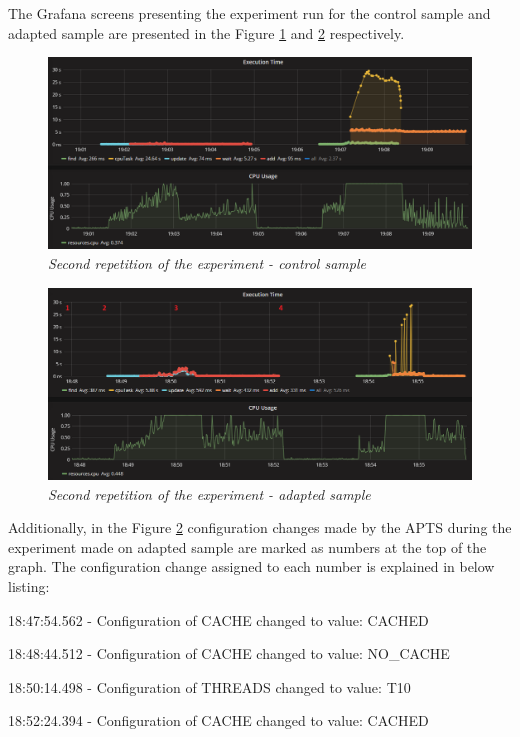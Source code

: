 \documentclass[12pt,a4paper]{article}
\let\tmpone\enumerate
\let\tmptwo\endenumerate
\renewenvironment{enumerate}{\tmpone\addtolength{\itemsep}{-0.4\baselineskip}}{\tmptwo}
\begin{document}
The Grafana screens presenting the experiment run for the control sample and adapted sample are presented in the Figure \ref{figure:random:screen:control:2} and \ref{figure:random:screen:adapted:2} respectively. 


\begin{figure}[!htb]
\centering
\includegraphics[width=1\textwidth]{2-ctrl}
\caption{\textit{Second repetition of the experiment - control sample}} \label{figure:random:screen:control:2}
\end{figure}

\begin{figure}[!htb]
\centering
\includegraphics[width=1\textwidth]{2-adap}
\caption{\textit{Second repetition of the experiment - adapted sample}} \label{figure:random:screen:adapted:2}
\end{figure}

Additionally, in the Figure \ref{figure:random:screen:adapted:2} configuration changes made by the APTS during the experiment made on adapted sample are marked as numbers at the top of the graph. The configuration change assigned to each number is explained in below listing: 

\begin{enumerate}
\item 18:47:54.562 - Configuration of CACHE changed to value: CACHED
\item 18:48:44.512 - Configuration of CACHE changed to value: NO\_CACHE
\item 18:50:14.498 - Configuration of THREADS changed to value: T10
\item 18:52:24.394 - Configuration of CACHE changed to value: CACHED
\end{enumerate}
\end{document}
